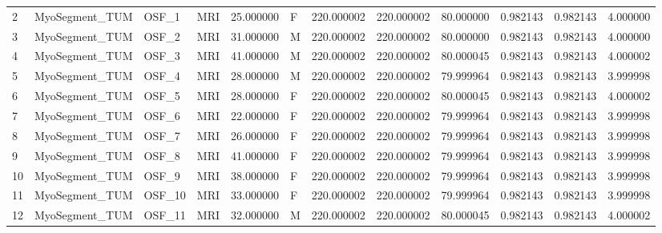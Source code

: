 \begin{tabular}{llllrlrrrrrr}
2      &  MyoSegment\_TUM &        OSF\_1 &                MRI &  25.000000 &        F &       220.000002 &    220.000002 &   80.000000 &               0.982143 &            0.982143 &          4.000000 \\
3      &  MyoSegment\_TUM &        OSF\_2 &                MRI &  31.000000 &        M &       220.000002 &    220.000002 &   80.000000 &               0.982143 &            0.982143 &          4.000000 \\
4      &  MyoSegment\_TUM &        OSF\_3 &                MRI &  41.000000 &        M &       220.000002 &    220.000002 &   80.000045 &               0.982143 &            0.982143 &          4.000002 \\
5      &  MyoSegment\_TUM &        OSF\_4 &                MRI &  28.000000 &        M &       220.000002 &    220.000002 &   79.999964 &               0.982143 &            0.982143 &          3.999998 \\
6      &  MyoSegment\_TUM &        OSF\_5 &                MRI &  28.000000 &        F &       220.000002 &    220.000002 &   80.000045 &               0.982143 &            0.982143 &          4.000002 \\
7      &  MyoSegment\_TUM &        OSF\_6 &                MRI &  22.000000 &        F &       220.000002 &    220.000002 &   79.999964 &               0.982143 &            0.982143 &          3.999998 \\
8      &  MyoSegment\_TUM &        OSF\_7 &                MRI &  26.000000 &        F &       220.000002 &    220.000002 &   79.999964 &               0.982143 &            0.982143 &          3.999998 \\
9      &  MyoSegment\_TUM &        OSF\_8 &                MRI &  41.000000 &        F &       220.000002 &    220.000002 &   79.999964 &               0.982143 &            0.982143 &          3.999998 \\
10     &  MyoSegment\_TUM &        OSF\_9 &                MRI &  38.000000 &        F &       220.000002 &    220.000002 &   79.999964 &               0.982143 &            0.982143 &          3.999998 \\
11     &  MyoSegment\_TUM &       OSF\_10 &                MRI &  33.000000 &        F &       220.000002 &    220.000002 &   79.999964 &               0.982143 &            0.982143 &          3.999998 \\
12     &  MyoSegment\_TUM &       OSF\_11 &                MRI &  32.000000 &        M &       220.000002 &    220.000002 &   80.000045 &               0.982143 &            0.982143 &          4.000002 \\

\end{tabular}
